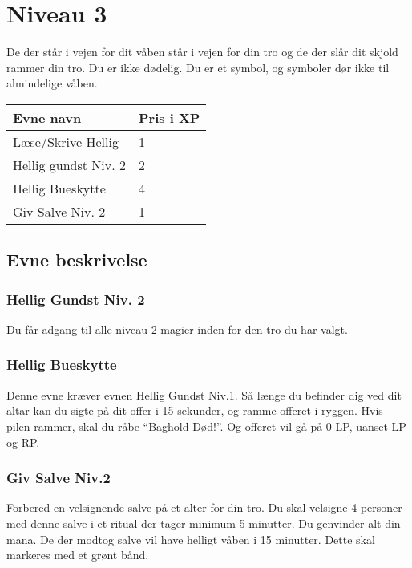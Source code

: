 \chapter{Niveau 3}
De der står i vejen for dit våben står i vejen for din tro og de der slår dit skjold rammer din tro. Du er ikke dødelig. Du er et symbol, og symboler dør ikke til almindelige våben.

\begin{table}[H]
    \centering
    \begin{tabular}{|p{}|p{}|}
    \rowcolor{cerulean!80}\hline
        Evne navn & Pris i XP \\\hline
        Læse/Skrive Hellig & 1\\\hline
        Hellig gundst Niv. 2 &2\\\hline
        Hellig Bueskytte & 4\\\hline
        Giv Salve Niv. 2 & 1\\\hline
    \end{tabular}
\end{table}
\section{Evne beskrivelse}



\subsection{Hellig Gundst Niv. 2}
Du får adgang til alle niveau 2 magier inden for den tro du har valgt.

\subsection{Hellig Bueskytte}
Denne evne kræver evnen Hellig Gundst Niv.1. Så længe du befinder dig ved dit altar kan du sigte på dit offer i 15 sekunder, og ramme offeret i ryggen. Hvis pilen rammer, skal du råbe “Baghold Død!”. Og offeret vil gå på 0 LP, uanset LP og RP.

\subsection{Giv Salve Niv.2}
Forbered en velsignende salve på et alter for din tro. Du skal velsigne 4 personer med denne salve i et ritual der tager minimum 5 minutter. Du genvinder alt din mana. De der modtog salve vil have helligt våben i 15 minutter. Dette skal markeres med et grønt bånd.